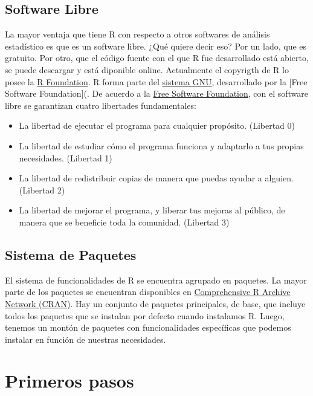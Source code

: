 \documentclass[spanish,]{book}
\providecommand{\tightlist}{%
  \setlength{\itemsep}{0pt}\setlength{\parskip}{0pt}}
\begin{document}
\section{Software Libre}\label{software-libre}

La mayor ventaja que tiene R con respecto a otros softwares de análisis
estadístico es que es un software libre. ¿Qué quiere decir eso? Por un
lado, que es gratuito. Por otro, que el código fuente con el que R fue
desarrollado está abierto, se puede descargar y está diponible online.
Actualmente el copyrigth de R lo posee la
\href{https://www.r-project.org/foundation/}{R Foundation}. R forma
parte del \href{https://es.wikipedia.org/wiki/GNU}{sistema GNU},
desarrollado por la {[}Free Software Foundation{]}(. De acuerdo a la
\href{https://es.wikipedia.org/wiki/Free_Software_Foundation}{Free
Software Foundation}, con el software libre se garantizan cuatro
libertades fundamentales:

\begin{itemize}
\tightlist
\item
  La libertad de ejecutar el programa para cualquier propósito.
  (Libertad 0)
\item
  La libertad de estudiar cómo el programa funciona y adaptarlo a tus
  propias necesidades. (Libertad 1)
\item
  La libertad de redistribuir copias de manera que puedas ayudar a
  alguien. (Libertad 2)
\item
  La libertad de mejorar el programa, y liberar tus mejoras al público,
  de manera que se beneficie toda la comunidad. (Libertad 3)
\end{itemize}

\section{Sistema de Paquetes}\label{sistema-de-paquetes}

El sistema de funcionalidades de R se encuentra agrupado en paquetes. La
mayor parte de los paquetes se encuentran disponibles en
\href{https://cran.r-project.org/}{Comprehensive R Archive Network
(CRAN)}. Hay un conjunto de paquetes principales, de base, que incluye
todos los paquetes que se instalan por defecto cuando instalamos R.
Luego, tenemos un montón de paquetes con funcionalidades específicas que
podemos instalar en función de nuestras necesidades.

\chapter{Primeros pasos}\label{primeros-pasos}
\end{document}
